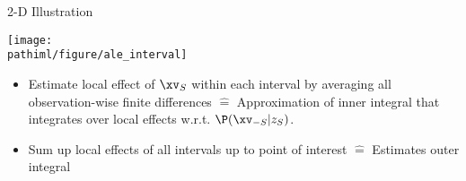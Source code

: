 \documentclass[11pt,compress,t,notes=noshow, aspectratio=169, xcolor=table]{beamer}
\newcommand{\pathiml}{../../slides/03_feature-effects/}
\begin{document}
\begin{frame}{2-D Illustration}
\centerline{\texttt{[image: \\pathiml/figure/ale\_interval]}}

 \begin{itemize}
  \item Estimate local effect of $\xv_S$ within each interval by averaging all observation-wise finite differences $\hat = $ Approximation of inner integral that integrates over local effects w.r.t. $\P(\xv_{-S} | z_S)$. %
  \item Sum up local effects of all intervals up to point of interest $\hat = $ Estimates outer integral
\end{itemize}

\end{frame}
%
%
%
%
%
%
%
%
%
%
%
%
%
%
%
%
\end{document}
